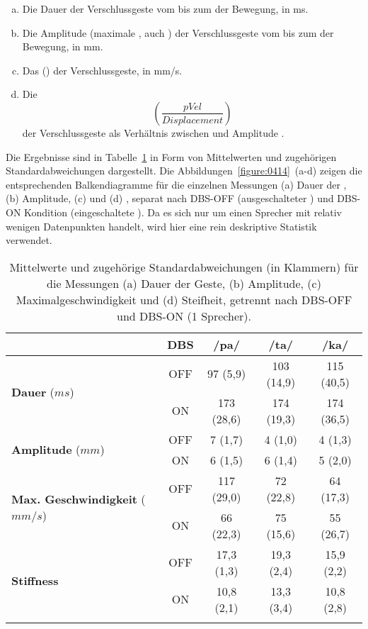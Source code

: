 \begin{enumerate}[(a)]
	\item Die Dauer der Verschlussgeste vom  bis zum  der Bewegung, in ms.
	\item Die Amplitude (maximale , auch ) der Verschlussgeste vom  bis zum  der Bewegung, in mm.
	\item Das  () der Verschlussgeste, in mm/s.
	\item Die  \[\left(\frac{pVel}{Displacement}\right)\] der Verschlussgeste als Verhältnis zwischen  und Amplitude \citep[nach][]{Munhall1985}.
\end{enumerate}

Die Ergebnisse sind in Tabelle~\ref{table:0401} in Form von Mittelwerten und zugehörigen Standardabweichungen dargestellt. Die Abbildungen~\ref{figure:0414}~(a-d) zeigen die entsprechenden Balkendiagramme für die einzelnen Messungen (a) Dauer der , (b) Amplitude, (c)  und (d) , separat nach DBS-OFF (ausgeschalteter ) und DBS-ON Kondition (eingeschaltete ). Da es sich nur um einen Sprecher mit relativ wenigen Datenpunkten handelt, wird hier eine rein deskriptive Statistik verwendet.

\begin{table}[htpb] 
	\begin{tabularx}{\textwidth}{Xcccc} \lsptoprule
		& \textbf{DBS} & \textbf{/pa/} & \textbf{/ta/} & \textbf{/ka/}\\ \midrule
\multirow{2}{*}{\textbf{Dauer} ($ms$)} & OFF & 97 (5,9) & 103 (14,9) & 115 (40,5)\\
		& ON &  173 (28,6) & 174 (19,3) & 174 (36,5)\\ \cmidrule(lr){1-5}
\multirow{2}{*}{\textbf{Amplitude} ($mm$)} & OFF &  7 (1,7) &  4 (1,0) &  4 (1,3)\\
		& ON &  6 (1,5) &  6 (1,4) &  5 (2,0)\\ \cmidrule(lr){1-5}
\multirow{2}{*}{\textbf{Max. Geschwindigkeit} ($mm/s$)} & OFF &  117 (29,0) &  72 (22,8) &  64 (17,3)\\
		& ON &  66 (22,3) &  75 (15,6) &  55 (26,7)\\ \cmidrule(lr){1-5}
\multirow{2}{*}{\textbf{Stiffness}} & OFF &  17,3 (1,3) &  19,3 (2,4) &  15,9 (2,2)\\
		& ON &  10,8 (2,1) &  13,3 (3,4) &  10,8 (2,8)\\ \lspbottomrule
	\end{tabularx} 
	\caption{Mittelwerte und zugehörige Standardabweichungen (in Klammern) für die Messungen (a) Dauer der Geste, (b) Amplitude, (c) Maximalgeschwindigkeit und (d) Steifheit, getrennt nach DBS-OFF und DBS-ON (1 Sprecher).}
	\label{table:0401}
\end{table}

